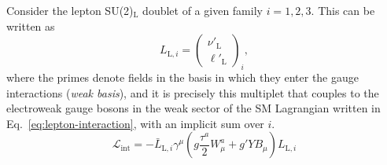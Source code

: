 Consider the lepton SU(2)$_\text{L}$ doublet of a given family $i = 1, 2, 3$. This can be written as
\begin{equation}
    \label{eq:weak-lepton-doublet}
    L_{\text{L}, i} = \begin{pmatrix}
                            \nu'_{\text{L}} \\
                            \ell'_{\text{L}}
                      \end{pmatrix}_i ,
\end{equation}
where the primes denote fields in the basis in which they enter the gauge interactions (\textit{weak basis}), and it is precisely this multiplet that couples to the electroweak gauge bosons in the weak sector of the \ac{SM} Lagrangian written in Eq.~\ref{eq:lepton-interaction}, with an implicit sum over $i$.
\begin{equation}
    \label{eq:lepton-interaction}
    \mathcal{L}_{\text{int}} = - \bar{L}_{\text{L}, i} \gamma^\mu \left( g \frac{\tau^a}{2} W_\mu^a + g' Y B_\mu \right) L_{\text{L}, i}
\end{equation}

